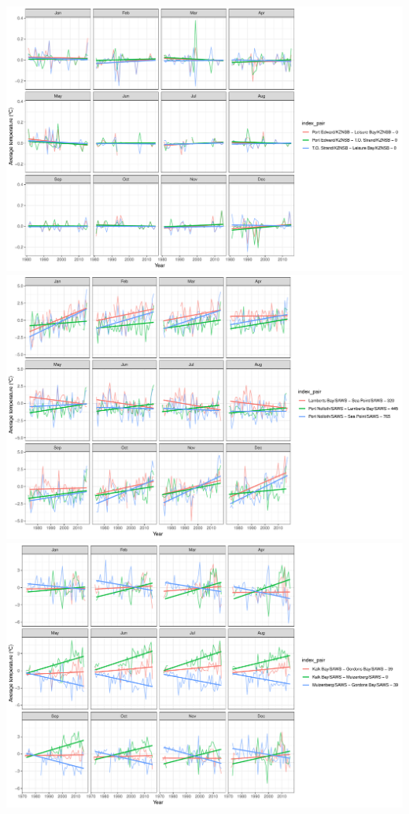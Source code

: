 \documentclass[12pt,A4paper,]{article}
\begin{document}
\includegraphics{../figures/SACTN_clust_4_plot2.pdf}
\includegraphics{../figures/SACTN_clust_5_plot2.pdf}
\includegraphics{../figures/SACTN_clust_6_plot2.pdf}
\end{document}
